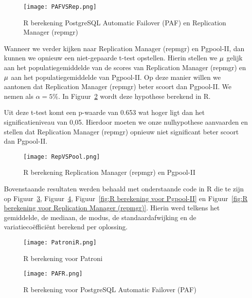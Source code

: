 \begin{figure}[!h]
    \centering
    \texttt{[image: PAFVSRep.png]}
    \caption{R berekening PostgreSQL Automatic Failover (PAF) en Replication Manager (repmgr)}
    \label{fig:R berekening PostgreSQL Automatic Failover (PAF) en Replication Manager (repmgr)}
\end{figure}

Wanneer we verder kijken naar Replication Manager (repmgr) en Pgpool-II, dan kunnen we opnieuw een niet-gepaarde t-test opstellen. Hierin stellen we $\mu\index{1}$ gelijk aan het populatiegemiddelde van de scores van Replication Manager (repmgr) en $\mu\index{2}$ aan het populatiegemiddelde van Pgpool-II. Op deze manier willen we aantonen dat Replication Manager (repmgr) beter scoort dan Pgpool-II. We nemen als $\alpha = 5\%$. In Figuur~\ref{fig:R berekening Replication Manager (repmgr) en Pgpool-II} wordt deze hypothese berekend in R.

Uit deze t-test komt een p-waarde van 0.653 wat hoger ligt dan het significatieniveau van 0,05. Hierdoor moeten we onze nulhypothese aanvaarden en stellen dat Replication Manager (repmgr) opnieuw niet significant beter scoort dan Pgpool-II.

\begin{figure}[!h]
    \centering
    \texttt{[image: RepVSPool.png]}
    \caption{R berekening Replication Manager (repmgr) en Pgpool-II}
    \label{fig:R berekening Replication Manager (repmgr) en Pgpool-II}
\end{figure}


Bovenstaande resultaten werden behaald met onderstaande code in R die te zijn op Figuur~\ref{fig:R berekening voor Patroni}, Figuur~\ref{fig:R berekening voor PostgreSQL Automatic Failover (PAF)}, Figuur~\ref{fig:R berekening voor Pgpool-II} en Figuur~\ref{fig:R berekening voor Replication Manager (repmgr)}. Hierin werd telkens het gemiddelde, de mediaan, de modus, de standaardafwijking en de variatiecoëfficiënt berekend per oplossing.

\begin{figure}[!h]
    \centering
    \texttt{[image: PatroniR.png]}
    \caption{R berekening voor Patroni}
    \label{fig:R berekening voor Patroni}
\end{figure}

\begin{figure}[!h]
    \centering
    \texttt{[image: PAFR.png]}
    \caption{R berekening voor PostgreSQL Automatic Failover (PAF)}
    \label{fig:R berekening voor PostgreSQL Automatic Failover (PAF)}
\end{figure}

